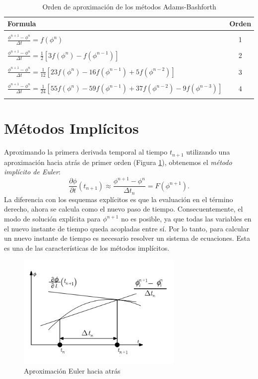 \documentclass[a4paper,10pt, oneside]{book}
\begin{document}
$~$

\begin{table}[h!]
\centering
\begin{tabular}{|l c|}
\hline 
Formula & Orden \\
\hline
 & \\
$\frac{\phi^{n+1} - \phi^n}{\Delta t} = f(\phi^n)$ & 1 \\ 
 & \\
$\frac{\phi^{n+1} - \phi^n}{\Delta t} = \frac12 \left[ 3 f(\phi^n) - f(\phi^{n-1}) \right]$ & 2 \\ 
 & \\
$\frac{\phi^{n+1} - \phi^n}{\Delta t} = \frac{1}{12} \left[ 23 f(\phi^n) - 16 f(\phi^{n-1}) + 5 f(\phi^{n-2}) \right]$ & 3 \\ 
 & \\
$\frac{\phi^{n+1} - \phi^n}{\Delta t} = \frac{1}{24} \left[ 55 f(\phi^n) - 59 f(\phi^{n-1}) + 37 f(\phi^{n-2}) - 9 f(\phi^{n-3}) \right]$ & 4 \\ 
 & \\ 
\hline 
\end{tabular} 
\caption{Orden de aproximación de los métodos Adams-Bashforth}
\label{tabla51}
\end{table}

\section{Métodos Implícitos}

Aproximando la primera derivada temporal al tiempo $t_{n+1}$ utilizando una aproximación hacia atrás de primer orden (Figura \ref{img:5-7}), obtenemos el \textit{método implícito de Euler}:
\begin{equation}
	\frac{\partial \phi }{\partial t}(t_{n+1}) \approx \frac{\phi^{n+1} -\phi^n}{\Delta t_n} = F(\phi^{n+1}). \nonumber
\end{equation}
La diferencia con los esquemas explícitos es que la evaluación en el término derecho, ahora se calcula como el nuevo paso de tiempo. Consecuentemente, el modo de solución explícita para $\phi^{n+1}$ no es posible, ya que todas las variables en el nuevo instante de tiempo queda acopladas entre sí. Por lo tanto, para calcular un nuevo instante de tiempo es necesario resolver un sistema de ecuaciones. Esta es una de las características de los métodos implícitos.
\begin{figure}[h!]
	\centering
	\includegraphics[width=8cm]{Img/5-7}
	\caption{Aproximación Euler hacia atrás}
	\label{img:5-7}
\end{figure}
\end{document}

